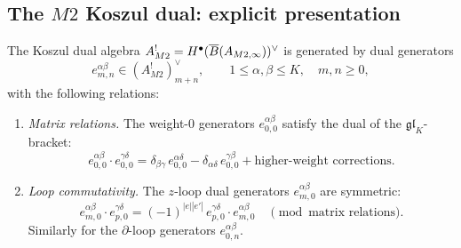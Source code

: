 \subsection{The \texorpdfstring{$M2$}{M2} Koszul dual: explicit presentation}

\begin{theorem}
The Koszul dual algebra $A^!_{M2}
= H^\bullet(\overline{B}(A_{M2,\infty}))^{\vee}$ is generated by
dual generators
\[
e^{\alpha\beta}_{m,n}
\in (A^!_{M2})^{\vee}_{m+n},
\qquad 1\le\alpha,\beta\le K,\quad m,n\ge 0,
\]
with the following relations:
\begin{enumerate}[label=(\roman*),leftmargin=1.8em]
\item \emph{Matrix relations.} The weight-$0$ generators
$e^{\alpha\beta}_{0,0}$ satisfy the dual of the
$\mathfrak{gl}_K$-bracket:
\begin{equation}%
e^{\alpha\beta}_{0,0}\cdot e^{\gamma\delta}_{0,0}
= \delta_{\beta\gamma}\,e^{\alpha\delta}_{0,0}
- \delta_{\alpha\delta}\,e^{\gamma\beta}_{0,0}
+ \text{higher-weight corrections}.
\end{equation}

\item \emph{Loop commutativity.} The $z$-loop dual generators
$e^{\alpha\beta}_{m,0}$ are symmetric:
\begin{equation}%
e^{\alpha\beta}_{m,0}\cdot e^{\gamma\delta}_{p,0}
= (-1)^{|e||e'|}\,e^{\gamma\delta}_{p,0}\cdot e^{\alpha\beta}_{m,0}
\quad\pmod{\text{matrix relations}}.
\end{equation}
Similarly for the $\partial$-loop generators $e^{\alpha\beta}_{0,n}$.


\end{enumerate}
\end{theorem}

